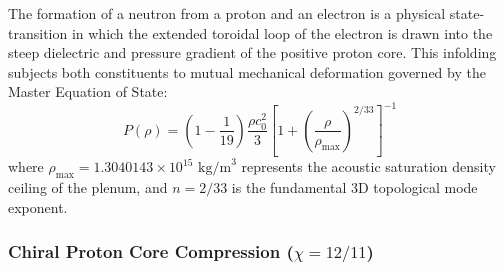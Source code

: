 \documentclass[11pt,a4paper]{article}
\begin{document}
The formation of a neutron from a proton and an electron is a physical state-transition in which the extended toroidal loop of the electron is drawn into the steep dielectric and pressure gradient of the positive proton core. This infolding subjects both constituents to mutual mechanical deformation governed by the Master Equation of State:
\begin{equation}
P(\rho) = \left(1 - \frac{1}{19}\right) \frac{\rho c_0^2}{3} \left[ 1 + \left( \frac{\rho}{\rho_{\max}} \right)^{2/33} \right]^{-1}
\label{eq:master_eos_subatomic}
\end{equation}
where $\rho_{\max} = 1.3040143 \times 10^{15}\text{ kg/m}^3$ represents the acoustic saturation density ceiling of the plenum, and $n = 2/33$ is the fundamental 3D topological mode exponent.

\subsubsection{Chiral Proton Core Compression ($\chi = 12/11$)}
\label{subsubsec:core_compression}
\end{document}
